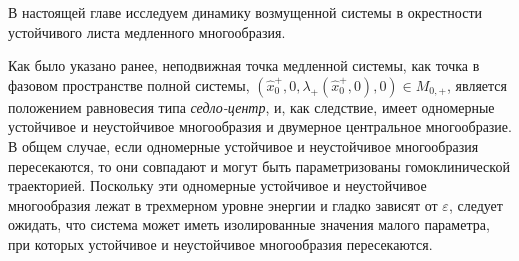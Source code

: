 В настоящей главе исследуем динамику возмущенной системы в окрестности устойчивого листа медленного многообразия.
    
Как было указано ранее, неподвижная точка медленной системы, как точка в фазовом пространстве полной системы, $(\hat x^{+}_0, 0, \lambda_{+}(\hat x^{+}_0, 0), 0) \in M_{0,+}$, является положением равновесия типа \textit{седло-центр}, и, как следствие, имеет одномерные устойчивое и неустойчивое многообразия и двумерное центральное многообразие. В общем случае, если одномерные устойчивое и неустойчивое многообразия пересекаются, то они совпадают и могут быть параметризованы гомоклинической траекторией. Поскольку эти одномерные устойчивое и неустойчивое многообразия лежат в трехмерном уровне энергии и гладко зависят от $\varepsilon$, следует ожидать, что система может иметь изолированные значения малого параметра, при которых  устойчивое и неустойчивое многообразия пересекаются.